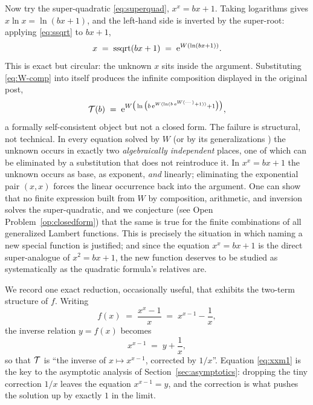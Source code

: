 Now try the super-quadratic \eqref{eq:superquad}, $x^{x} = bx + 1$.
Taking logarithms gives $x \ln x = \ln(bx+1)$, and the left-hand side is
inverted by the super-root: applying \eqref{eq:ssqrt} to $bx + 1$,
\begin{equation}\label{eq:W-comp}
    x \;=\; \operatorname{ssqrt}(bx + 1) \;=\; \mathrm{e}^{W(\ln(bx + 1))} .
\end{equation}
This is exact but circular: the unknown $x$ sits inside the argument.
Substituting \eqref{eq:W-comp} into itself produces the infinite
composition displayed in the original post,
\begin{equation}\label{eq:W-nest}
    \mathcal{T}(b) \;=\; \mathrm{e}^{W\big(\ln\big(b\,\mathrm{e}^{W(\ln(b\,\mathrm{e}^{W(\cdots)}+1))}+1\big)\big)},
\end{equation}
a formally self-consistent object but not a closed form. The failure is
structural, not technical. In every equation solved by $W$ (or by its
generalizations \cite{mezobaricz}) the unknown occurs in exactly two
\emph{algebraically independent} places, one of which can be eliminated
by a substitution that does not reintroduce it. In $x^{x} = bx + 1$ the
unknown occurs as base, as exponent, \emph{and} linearly; eliminating the
exponential pair $(x, x)$ forces the linear occurrence back into the
argument. One can show that no finite expression built from $W$ by
composition, arithmetic, and inversion solves the super-quadratic, and
we conjecture (see Open Problem~\ref{op:closedform}) that the same is
true for the finite combinations of all generalized Lambert functions.
This is precisely the situation in which naming a new special function is
justified; and since the equation $x^{x} = bx+1$ is the direct
super-analogue of $x^{2} = bx + 1$, the new function deserves to be
studied as systematically as the quadratic formula's relatives are.

We record one exact reduction, occasionally useful, that exhibits the
two-term structure of $f$. Writing
\begin{equation}\label{eq:f-two-terms}
    f(x) \;=\; \frac{x^{x} - 1}{x} \;=\; x^{x-1} - \frac{1}{x},
\end{equation}
the inverse relation $y = f(x)$ becomes
\begin{equation}\label{eq:xxm1}
    x^{x-1} \;=\; y + \frac{1}{x} ,
\end{equation}
so that $\mathcal{T}$ is ``the inverse of $x \mapsto x^{x-1}$, corrected by
$1/x$''. Equation \eqref{eq:xxm1} is the key to the asymptotic analysis
of Section~\ref{sec:asymptotics}: dropping the tiny correction $1/x$
leaves the equation $x^{x-1} = y$, and the correction is what pushes the
solution up by exactly $1$ in the limit.
